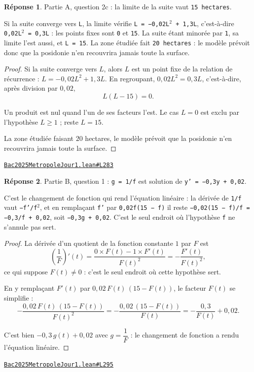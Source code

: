 \documentclass[11pt,a4paper]{article}
\theoremstyle{definition}
\theoremstyle{plain}
\theoremstyle{definition}
\newtheorem*{reponse}{Réponse}
\newcommand{\source}[2]{\par\smallskip\noindent\hfill{\footnotesize\href{#1}{\texttt{#2}}}\par\smallskip}
\begin{document}
\begin{reponse}
Partie A, question 2c : la limite de la suite vaut \texttt{15 hectares}.

Si la suite converge vers \texttt{L}, la limite vérifie \texttt{L = −0,02L\(^{2}\) + 1,3L}, c'est-à-dire
\texttt{0,02L\(^{2}\) = 0,3L} : les points fixes sont \texttt{0} et \texttt{15}. La suite étant minorée par \texttt{1},
sa limite l'est aussi, et \texttt{L = 15}. La zone étudiée fait \texttt{20 hectares} : le modèle
prévoit donc que la posidonie n'en recouvrira jamais toute la surface.
\end{reponse}
\begin{proof}
Si la suite converge vers $L$, alors $L$ est un point fixe de la relation de récurrence :
$L = -0{,}02L^2 + 1{,}3L$. En regroupant, $0{,}02L^2 = 0{,}3L$, c'est-à-dire, après
division par $0{,}02$,
\[ L(L - 15) = 0 . \]

Un produit est nul quand l'un de ses facteurs l'est. Le cas $L = 0$ est exclu par
l'hypothèse $L \ge 1$ ; reste $L = 15$.

La zone étudiée faisant $20$ hectares, le modèle prévoit que la posidonie n'en recouvrira
jamais toute la surface.
\end{proof}
\source{https://github.com/Commutator-IO/learn-lean/blob/main/exams/2025/Bac2025MetropoleJour1.lean\#L283}{Bac2025MetropoleJour1.lean\#L283}

\begin{reponse}
Partie B, question 1 : \texttt{g = 1/f} est solution de \texttt{y' = −0,3y + 0,02}.

C'est le changement de fonction qui rend l'équation linéaire : la dérivée de \texttt{1/f}
vaut \texttt{−f'/f\(^{2}\)}, et en remplaçant \texttt{f'} par \texttt{0,02f(15 − f)} il reste
\texttt{−0,02(15 − f)/f = −0,3/f + 0,02}, soit \texttt{−0,3g + 0,02}. C'est le seul endroit où
l'hypothèse \og{} \texttt{f} ne s'annule pas \fg{} sert.
\end{reponse}
\begin{proof}
La dérivée d'un quotient de la fonction constante $1$ par $F$ est
\[ \left(\frac{1}{F}\right)'(t)
   = \frac{0 \times F(t) - 1 \times F'(t)}{F(t)^2} = -\frac{F'(t)}{F(t)^2} , \]
ce qui suppose $F(t) \ne 0$ : c'est le seul endroit où cette hypothèse sert.

En y remplaçant $F'(t)$ par $0{,}02\,F(t)\,(15 - F(t))$, le facteur $F(t)$ se simplifie :
\[ -\frac{0{,}02\,F(t)\,(15 - F(t))}{F(t)^2}
   = -\frac{0{,}02\,(15 - F(t))}{F(t)}
   = -\frac{0{,}3}{F(t)} + 0{,}02 . \]

C'est bien $-0{,}3\,g(t) + 0{,}02$ avec $g = \dfrac{1}{F}$ : le changement de fonction a
rendu l'équation linéaire.
\end{proof}
\source{https://github.com/Commutator-IO/learn-lean/blob/main/exams/2025/Bac2025MetropoleJour1.lean\#L295}{Bac2025MetropoleJour1.lean\#L295}
\end{document}
